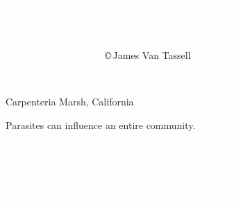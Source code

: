 \documentclass[t]{beamer}
\begin{document}
%
{
\begin{frame}[b]{}
\hfill\tiny\textcolor{white}{Kevin  Bryant, Flickr }
\end{frame}
}
%
{
\begin{frame}[t]

\vspace*{70mm}

\hfill \tiny \textcolor{white}{\copyright\,Dave Burdick}

\vfilll

\tiny \textcolor{white}{James St. John, Flickr } \hfill \copyright\,James Van Tassell
\end{frame}
}
%
{
\begin{frame}[b]{}
\hfill\tiny\textcolor{white}{edgeplot, Flickr }
\end{frame}
}
%
{
\begin{frame}[t]{Carpenteria Marsh, California}
\end{frame}
}
%
{
\begin{frame}[t]{Parasites can influence an entire community.}
\end{frame}
}
%
{
\begin{frame}[b]{}
\hfill\tiny\textcolor{white}{\textcopyright\,Theodore W. Pietsch, University of Washington.}
\end{frame}
}
%
%
{
	\begin{frame}[b]{\textcolor{white}{Can predators evolve resistance to cane toad toxins?}}
		
		\vfilll
		
		\hfill \tiny \textcolor{white}{Brian Gratwicke, Wikimedia }
	\end{frame}
}

\end{document}
